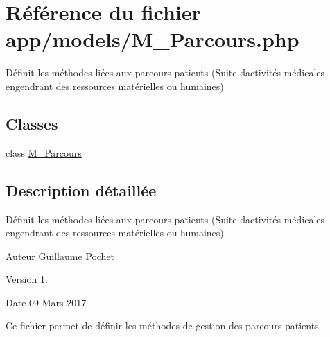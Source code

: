 \hypertarget{_m___parcours_8php}{}\section{Référence du fichier app/models/\+M\+\_\+\+Parcours.php}
\label{_m___parcours_8php}


Définit les méthodes liées aux parcours patients (Suite d\textquotesingle{}activités médicales engendrant des ressources matérielles ou humaines)  


\subsection*{Classes}
\begin{DoxyCompactItemize}
\item 
class \hyperlink{class_m___parcours}{M\+\_\+\+Parcours}
\end{DoxyCompactItemize}


\subsection{Description détaillée}
Définit les méthodes liées aux parcours patients (Suite d\textquotesingle{}activités médicales engendrant des ressources matérielles ou humaines) 

\begin{DoxyAuthor}{Auteur}
Guillaume Pochet 
\end{DoxyAuthor}
\begin{DoxyVersion}{Version}
1. 
\end{DoxyVersion}
\begin{DoxyDate}{Date}
09 Mars 2017
\end{DoxyDate}
Ce fichier permet de définir les méthodes de gestion des parcours patients 